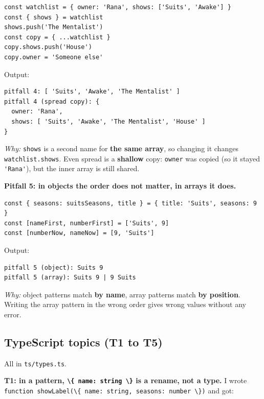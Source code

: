 \documentclass[
  10pt,
]{article}
\newcommand{\passthrough}[1]{#1}
\begin{document}
\begin{lstlisting}
const watchlist = { owner: 'Rana', shows: ['Suits', 'Awake'] }
const { shows } = watchlist
shows.push('The Mentalist')
const copy = { ...watchlist }
copy.shows.push('House')
copy.owner = 'Someone else'
\end{lstlisting}

Output:

\begin{lstlisting}
pitfall 4: [ 'Suits', 'Awake', 'The Mentalist' ]
pitfall 4 (spread copy): {
  owner: 'Rana',
  shows: [ 'Suits', 'Awake', 'The Mentalist', 'House' ]
}
\end{lstlisting}

\emph{Why:} \passthrough{\lstinline!shows!} is a second name for
\textbf{the same array}, so changing it changes
\passthrough{\lstinline!watchlist.shows!}. Even spread is a
\textbf{shallow} copy: \passthrough{\lstinline!owner!} was copied (so it
stayed \passthrough{\lstinline!'Rana'!}), but the inner array is still
shared.

\textbf{Pitfall 5: in objects the order does not matter, in arrays it
does.}

\begin{lstlisting}
const { seasons: suitsSeasons, title } = { title: 'Suits', seasons: 9 }
const [nameFirst, numberFirst] = ['Suits', 9]
const [numberNow, nameNow] = [9, 'Suits']
\end{lstlisting}

Output:

\begin{lstlisting}
pitfall 5 (object): Suits 9
pitfall 5 (array): Suits 9 | 9 Suits
\end{lstlisting}

\emph{Why:} object patterns match \textbf{by name}, array patterns match
\textbf{by position}. Writing the array pattern in the wrong order gives
wrong values without any error.

\hypertarget{typescript-topics-t1-to-t5}{%
\subsection{TypeScript topics (T1 to
T5)}\label{typescript-topics-t1-to-t5}}

All in \passthrough{\lstinline!ts/types.ts!}.

\textbf{T1: in a pattern, \passthrough{\lstinline!\{ name: string \}!}
is a rename, not a type.} I wrote
\passthrough{\lstinline!function showLabel(\{ name: string, seasons: number \})!}
and got:
\end{document}

